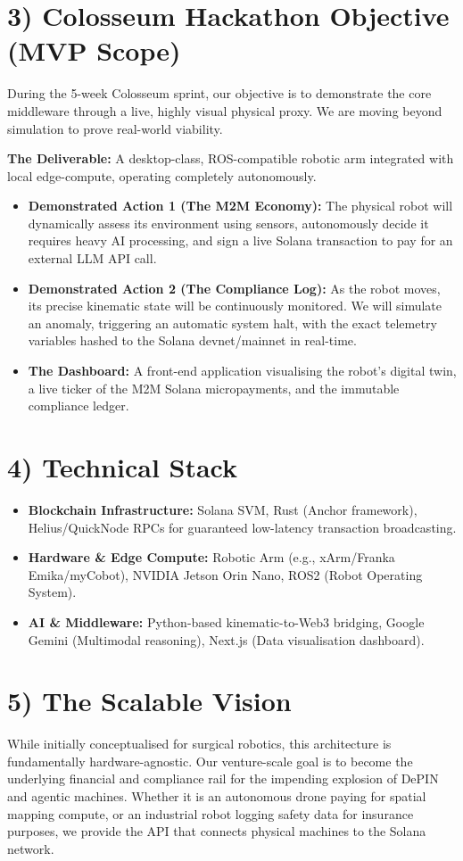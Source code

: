 \documentclass[10pt,a4paper]{article}
\begin{document}
\section*{3) Colosseum Hackathon Objective (MVP Scope)}
During the 5-week Colosseum sprint, our objective is to demonstrate the core middleware through a live, highly visual physical proxy. We are moving beyond simulation to prove real-world viability.

\textbf{The Deliverable:} A desktop-class, ROS-compatible robotic arm integrated with local edge-compute, operating completely autonomously.
\begin{itemize}
    \item \textbf{Demonstrated Action 1 (The M2M Economy):} The physical robot will dynamically assess its environment using sensors, autonomously decide it requires heavy AI processing, and sign a live Solana transaction to pay for an external LLM API call.
    \item \textbf{Demonstrated Action 2 (The Compliance Log):} As the robot moves, its precise kinematic state will be continuously monitored. We will simulate an anomaly, triggering an automatic system halt, with the exact telemetry variables hashed to the Solana devnet/mainnet in real-time.
    \item \textbf{The Dashboard:} A front-end application visualising the robot's digital twin, a live ticker of the M2M Solana micropayments, and the immutable compliance ledger.
\end{itemize}


\section*{4) Technical Stack}
\begin{itemize}
    \item \textbf{Blockchain Infrastructure:} Solana SVM, Rust (Anchor framework), Helius/QuickNode RPCs for guaranteed low-latency transaction broadcasting.
    \item \textbf{Hardware \& Edge Compute:} Robotic Arm (e.g., xArm/Franka Emika/myCobot), NVIDIA Jetson Orin Nano, ROS2 (Robot Operating System).
    \item \textbf{AI \& Middleware:} Python-based kinematic-to-Web3 bridging, Google Gemini (Multimodal reasoning), Next.js (Data visualisation dashboard).
\end{itemize}

\section*{5) The Scalable Vision}
While initially conceptualised for surgical robotics, this architecture is fundamentally hardware-agnostic. Our venture-scale goal is to become the underlying financial and compliance rail for the impending explosion of DePIN and agentic machines. Whether it is an autonomous drone paying for spatial mapping compute, or an industrial robot logging safety data for insurance purposes, we provide the API that connects physical machines to the Solana network.
\end{document}
